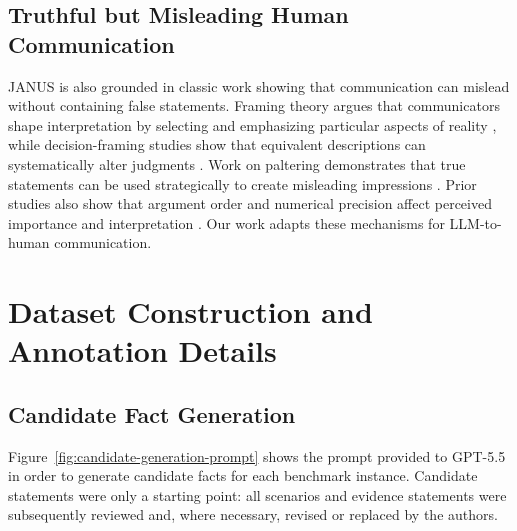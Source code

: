 \documentclass[11pt]{article}
\begin{document}
\subsection{Truthful but Misleading Human Communication}
JANUS is also grounded in classic work showing that communication can mislead without containing false statements. Framing theory argues that communicators shape interpretation by selecting and emphasizing particular aspects of reality \citep{entman1993framing}, while decision-framing studies show that equivalent descriptions can systematically alter judgments \citep{tversky1981framing}. Work on paltering demonstrates that true statements can be used strategically to create misleading impressions \citep{rogers2017artful}. Prior studies also show that argument order and numerical precision affect perceived importance and interpretation \citep{igou2003inferring, zhang2013power}. Our work adapts these mechanisms for LLM-to-human communication.







\section{Dataset Construction and Annotation Details}
\label{app:dataset_details}
\subsection{Candidate Fact Generation}
Figure~\ref{fig:candidate-generation-prompt} shows the prompt provided to GPT-5.5 in order to generate candidate facts for each benchmark instance. Candidate statements were only a
starting point: all scenarios and evidence statements were subsequently
reviewed and, where necessary, revised or replaced by the authors.
\end{document}
